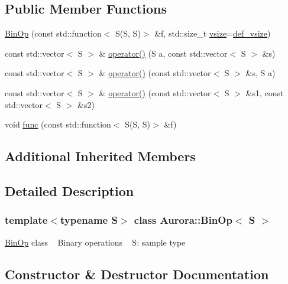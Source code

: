 \subsection*{Public Member Functions}
\begin{DoxyCompactItemize}
\item 
\hyperlink{class_aurora_1_1_bin_op_aa8b5c6b77e89f4c73847716a695be047}{Bin\+Op} (const std\+::function$<$ S(S, S)$>$ \&f, std\+::size\+\_\+t \hyperlink{class_aurora_1_1_snd_base_af9e21aaf411b17f7a8221c991ce5d291}{vsize}=\hyperlink{namespace_aurora_afaaddf667a06e7ce23c667a8b7295263}{def\+\_\+vsize})
\item 
const std\+::vector$<$ S $>$ \& \hyperlink{class_aurora_1_1_bin_op_aef7a0a9a5daa40c22e540f08ca928fab}{operator()} (S a, const std\+::vector$<$ S $>$ \&s)
\item 
const std\+::vector$<$ S $>$ \& \hyperlink{class_aurora_1_1_bin_op_a488095df0eb9f16da6643476dec9e51c}{operator()} (const std\+::vector$<$ S $>$ \&s, S a)
\item 
const std\+::vector$<$ S $>$ \& \hyperlink{class_aurora_1_1_bin_op_abe8a0b7666caeda012d9ac18f889e116}{operator()} (const std\+::vector$<$ S $>$ \&s1, const std\+::vector$<$ S $>$ \&s2)
\item 
void \hyperlink{class_aurora_1_1_bin_op_aa440ae97cd1e9f0e1aaa077a57850f3d}{func} (const std\+::function$<$ S(S, S)$>$ \&f)
\end{DoxyCompactItemize}
\subsection*{Additional Inherited Members}


\subsection{Detailed Description}
\subsubsection*{template$<$typename S$>$\newline
class Aurora\+::\+Bin\+Op$<$ S $>$}

\hyperlink{class_aurora_1_1_bin_op}{Bin\+Op} class ~\newline
Binary operations ~\newline
S\+: sample type 

\subsection{Constructor \& Destructor Documentation}
\mbox{\label{class_aurora_1_1_bin_op_aa8b5c6b77e89f4c73847716a695be047}} 
